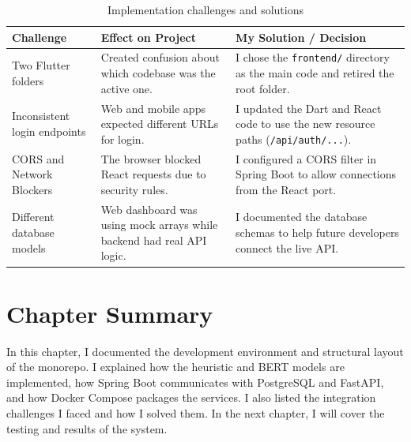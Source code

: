 \begin{table}[htbp]
  \centering
  \caption{Implementation challenges and solutions}
  \label{tab:implementation-challenges}
  \begin{tabularx}{\textwidth}{p{} p{} X}
    \toprule
    \textbf{Challenge} & \textbf{Effect on Project} & \textbf{My Solution / Decision}\\
    \midrule
    Two Flutter folders & Created confusion about which codebase was the active one. & I chose the \texttt{frontend/} directory as the main code and retired the root folder.\\
    Inconsistent login endpoints & Web and mobile apps expected different URLs for login. & I updated the Dart and React code to use the new resource paths (\texttt{/api/auth/...}).\\
    CORS and Network Blockers & The browser blocked React requests due to security rules. & I configured a CORS filter in Spring Boot to allow connections from the React port.\\
    Different database models & Web dashboard was using mock arrays while backend had real API logic. & I documented the database schemas to help future developers connect the live API.\\
    \bottomrule
  \end{tabularx}
\end{table}

\section{Chapter Summary}
In this chapter, I documented the development environment and structural layout of the monorepo. I explained how the heuristic and BERT models are implemented, how Spring Boot communicates with PostgreSQL and FastAPI, and how Docker Compose packages the services. I also listed the integration challenges I faced and how I solved them. In the next chapter, I will cover the testing and results of the system.
